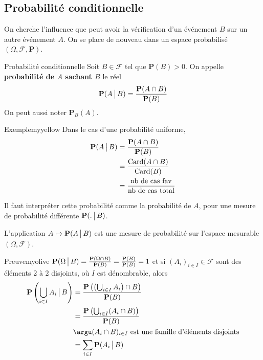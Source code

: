     \subsection{Probabilité conditionnelle}

    On cherche l’influence que peut avoir la vérification d’un événement $B$ sur un autre événement $A$. On se place de nouveau dans un espace probabilisé $(\Omega, \mathcal{F}, \mathbf{P})$.

    \begin{defi}{Probabilité conditionnelle}{}
        Soit $B \in \mathcal{F}$ tel que $\mathbf{P}(B) > 0$. On appelle \textbf{probabilité de $A$ sachant $B$} le réel 
        \[ \mathbf{P}(A \, \big| \, B) = \frac{\mathbf{P}(A \cap B)}{\mathbf{P}(B)} \]   
        On peut aussi noter $\mathbf{P}_B(A)$. 
    \end{defi}

    \begin{omed}{Exemple}{myyellow}
        Dans le cas d’une probabilité uniforme, 
        \begin{align*}
            \mathbf{P}(A \, \big| \, B) 
            &= \frac{\mathbf{P}(A \cap B)}{\mathbf{P}(B)} \\
            &= \frac{\operatorname{Card}(A \cap B)}{\operatorname{Card}(B)} \\
            &= \frac{\text{nb de cas fav}}{\text{nb de cas total}}
        \end{align*}
    \end{omed}

    Il faut interpréter cette probabilité comme la probabilité de $A$, pour une mesure de probabilité différente $\mathbf{P}(. \, \big| \, B)$. 

    \begin{prop}{}{}
        L’application $A \mapsto \mathbf{P}(A \, \big| \, B)$ est une mesure de probabilité sur l’espace mesurable $(\Omega, \mathcal{F})$. 
    \end{prop}

    \begin{demo}{Preuve}{myolive}
        $\mathbf{P}(\Omega \, \big| \, B) = \frac{\mathbf{P}(\Omega \cap B)}{\mathbf{P}(B)} = \frac{\mathbf{P}(B)}{\mathbf{P}(B)} = 1$ et si $(A_i)_{i \in I} \in \mathcal{F}$ sont des éléments 2 à 2 disjoints, où $I$ est dénombrable, alors 
        \begin{align*}
            \mathbf{P}\left(\bigcup_{i \in I} A_i \tq B\right) 
            &= \frac{\mathbf{P}\left(\left(\bigcup_{i \in I} A_i\right) \cap B\right)}{\mathbf{P}(B)} \\
            &= \frac{\mathbf{P}\left(\bigcup_{i \in I} (A_i \cap B)\right)}{\mathbf{P}(B)} \\
            &\argu (A_i \cap B)_{i \in I} \text{ est une famille d’éléments disjoints} \\
            &= \sum_{i \in I} \mathbf{P}(A_i \tq B) \\
        \end{align*}
    \end{demo}

